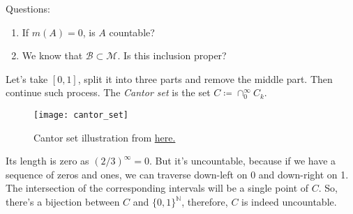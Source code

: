 Questions:
\begin{enumerate}
    \item {
        If $m(A) = 0$, is $A$ countable?
    }
    \item {
        We know that $\mathcal{B} \subset \mathcal{M}$. Is this inclusion proper?
    }
\end{enumerate}

\begin{definition}
    Let's take $[0, 1]$, split it into three parts and remove the middle part.
    Then continue such process.
    The \textit{Cantor set} is the set $C \coloneqq \cap_0^\infty C_k$.
\end{definition}

\begin{figure*}[h]
    \centering
    \texttt{[image: cantor\_set]}
    \caption*{Cantor set illustration from \href{http://tasks.illustrativemathematics.org/content-standards/tasks/929}{here.}}
\end{figure*}

\begin{remark}
    Its length is zero as $(2/3)^\infty = 0$. But it's uncountable,
    because if we have a sequence of zeros and ones, we can traverse 
    down-left on 0 and down-right on 1. The intersection of the corresponding
    intervals will be a single point of $C$. So, there's a bijection between
    $C$ and $\{0, 1\}^\mathbb{N}$, therefore, $C$ is indeed uncountable. 
\end{remark}
